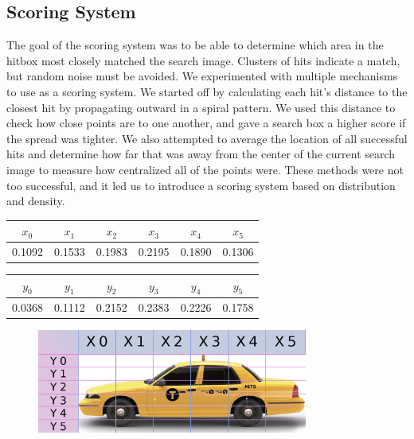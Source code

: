 \documentclass[10pt, journal]{vgtc}                %
\begin{document}
\subsection{Scoring System}
\begin{flushleft}
The goal of the scoring system was to be able to determine which area in the hitbox most closely matched the search image. Clusters of hits indicate a match, but random noise must be avoided. We experimented with multiple mechanisms to use as a scoring system. We started off by calculating each hit’s distance to the closest hit by propagating outward in a spiral pattern. We used this distance to check how close points are to one another, and gave a search box a higher score if the spread was tighter. We also attempted to average the location of all successful hits and determine how far that was away from the center of the current search image to measure how centralized all of the points were. These methods were not too successful, and it led us to introduce a scoring system based on distribution and density.\\
\begin{table}[h!]
	\label{vis_accept}
	\scriptsize
	\begin{center}
		\begin{tabular}{cccccc}
			$x_0$ & $x_1$ & $x_2$ & $x_3$ & $x_4$  & $x_5$\\
			\hline
			0.1092 &  0.1533 & 0.1983 & 0.2195 & 0.1890 & 0.1306 \\
		\end{tabular}
	\end{center}
	\begin{center}
		\begin{tabular}{cccccc}
			$y_0$ & $y_1$ & $y_2$ & $y_3$ & $y_4$  & $y_5$\\
			\hline
			0.0368 &  0.1112 & 0.2152 & 0.2383 & 0.2226 & 0.1758 \\
		\end{tabular}
\end{center}
\end{table}
\begin{figure}[h!]
\centering
\includegraphics[width=3.5in]{distribution.png}

\end{figure}
\end{flushleft}
\end{document}
